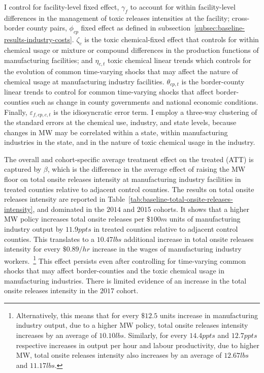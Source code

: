 \documentclass{C:/Users/david/OneDrive/Documents/ULMS/PhD/Thesis/chapter3/src/climate_change/latex/Economic_Journal/OUP-EJ}
\begin{document}
    I control for facility-level fixed effect, $\gamma_{f}$ to account for within facility-level differences in the management of toxic releases intensities at the facility; cross-border county pairs, $\phi_{cp}$ fixed effect as defined in subsection~\ref{subsec:baseline-results-industry-costs}. $\zeta_{c}$ is the toxic chemical-fixed effect that controls for within chemical usage or mixture or compound differences in the production functions of manufacturing facilities; and $\eta_{c,t}$ toxic chemical linear trends which controls for the evolution of common time-varying shocks that may affect the nature of chemical usage at manufacturing industry facilities. $\theta_{cp,t}$ is the border-county linear trends to control for common time-varying shocks that affect border-counties such as change in county governments and national economic conditions. Finally, $\varepsilon_{f,cp,c,t}$ is the idiosyncratic error term. I employ a three-way clustering of the standard errors at the chemical use, industry, and state levels, because changes in MW may be correlated within a state, within manufacturing industries in the state, and in the nature of toxic chemical usage in the industry.
    

    The overall and cohort-specific average treatment effect on the treated (ATT) is captured by $\beta$, which is the difference in the average effect of raising the MW floor on total onsite releases intensity at manufacturing industry facilities in treated counties relative to adjacent control counties. The results on total onsite releases intensity are reported in Table~\ref{tab:baseline-total-onsite-releases-intensity}, and dominated in the $2014$ and $2015$ cohorts. It shows that a higher MW policy increases total onsite releases per $\$100m$ units of manufacturing industry output by $11.9ppts$ in treated counties relative to adjacent control counties. This translates to a $10.47lbs$ additional increase in total onsite releases intensity for every $\$0.89/hr$ increase in the wages of manufacturing industry workers.~\footnote{\tiny Alternatively, this means that for every $\$12.5$ units increase in manufacturing industry output, due to a higher MW policy, total onsite releases intensity increases by an average of $10.10lbs$. Similarly, for every $14.4ppts$ and $12.7ppts$ respective increases in output per hour and labour productivity, due to higher MW, total onsite releases intensity also increases by an average of $12.67lbs$ and $11.17lbs$.} This effect persists even after controlling for time-varying common shocks that may affect border-counties and the toxic chemical usage in manufacturing industries. There is limited evidence of an increase in the total onsite releases intensity in the $2017$ cohort.
    
\end{document}
